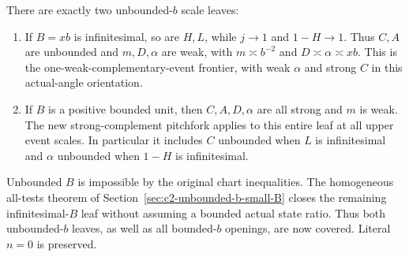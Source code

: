 There are exactly two unbounded-$b$ scale leaves:
\begin{enumerate}
\item If $B=xb$ is infinitesimal, so are $H,L$, while $j\to1$
and $1-H\to1$. Thus $C,A$ are unbounded and $m,D,\alpha$ are
weak, with $m\asymp b^{-2}$ and $D\asymp\alpha\asymp xb$.
This is the one-weak-complementary-event frontier, with weak
$\alpha$ and strong $C$ in this actual-angle orientation.
\item If $B$ is a positive bounded unit, then $C,A,D,\alpha$
are all strong and $m$ is weak. The new strong-complement pitchfork
applies to this entire leaf at all upper event scales. In particular
it includes $C$ unbounded when $L$ is infinitesimal and $\alpha$
unbounded when $1-H$ is infinitesimal.
\end{enumerate}
Unbounded $B$ is impossible by the original chart inequalities.
The homogeneous all-tests theorem of Section~\ref{sec:c2-unbounded-b-small-B}
closes the remaining infinitesimal-$B$ leaf without assuming a bounded
actual state ratio. Thus both unbounded-$b$ leaves, as well as all
bounded-$b$ openings, are now covered. Literal $n=0$ is preserved.
